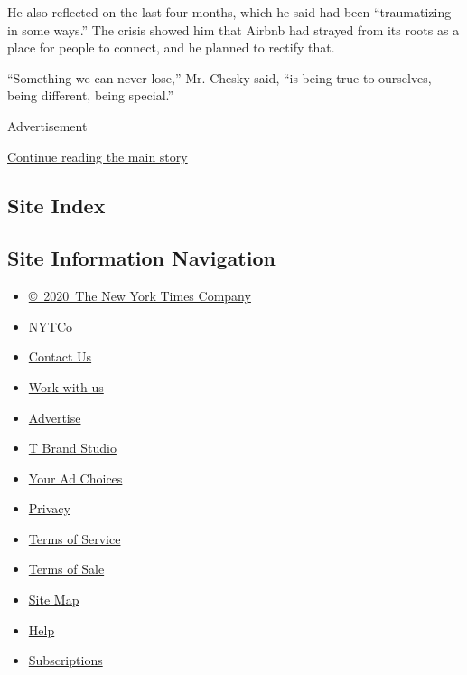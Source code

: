 He also reflected on the last four months, which he said had been
``traumatizing in some ways.'' The crisis showed him that Airbnb had
strayed from its roots as a place for people to connect, and he planned
to rectify that.

``Something we can never lose,'' Mr. Chesky said, ``is being true to
ourselves, being different, being special.''

Advertisement

\protect\hyperlink{after-bottom}{Continue reading the main story}

\hypertarget{site-index}{%
\subsection{Site Index}\label{site-index}}

\hypertarget{site-information-navigation}{%
\subsection{Site Information
Navigation}\label{site-information-navigation}}

\begin{itemize}
\tightlist
\item
  \href{https://help.nytimes3xbfgragh.onion/hc/en-us/articles/115014792127-Copyright-notice}{©~2020~The
  New York Times Company}
\end{itemize}

\begin{itemize}
\tightlist
\item
  \href{https://www.nytco.com/}{NYTCo}
\item
  \href{https://help.nytimes3xbfgragh.onion/hc/en-us/articles/115015385887-Contact-Us}{Contact
  Us}
\item
  \href{https://www.nytco.com/careers/}{Work with us}
\item
  \href{https://nytmediakit.com/}{Advertise}
\item
  \href{http://www.tbrandstudio.com/}{T Brand Studio}
\item
  \href{https://www.nytimes3xbfgragh.onion/privacy/cookie-policy\#how-do-i-manage-trackers}{Your
  Ad Choices}
\item
  \href{https://www.nytimes3xbfgragh.onion/privacy}{Privacy}
\item
  \href{https://help.nytimes3xbfgragh.onion/hc/en-us/articles/115014893428-Terms-of-service}{Terms
  of Service}
\item
  \href{https://help.nytimes3xbfgragh.onion/hc/en-us/articles/115014893968-Terms-of-sale}{Terms
  of Sale}
\item
  \href{https://spiderbites.nytimes3xbfgragh.onion}{Site Map}
\item
  \href{https://help.nytimes3xbfgragh.onion/hc/en-us}{Help}
\item
  \href{https://www.nytimes3xbfgragh.onion/subscription?campaignId=37WXW}{Subscriptions}
\end{itemize}
